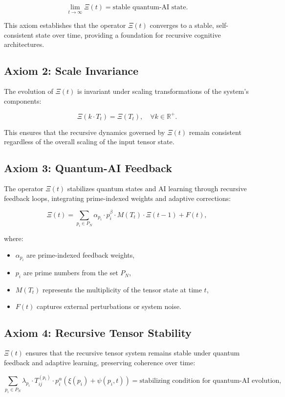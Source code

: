 \documentclass{article}
\theoremstyle{plain}
\begin{document}
\[
\lim_{t \to \infty} \Xi(t) = \text{stable quantum-AI state}.
\]

This axiom establishes that the operator \(\Xi(t)\) converges to a stable, self-consistent state over time, providing a foundation for recursive cognitive architectures.

\subsection{Axiom 2: Scale Invariance}
The evolution of \(\Xi(t)\) is invariant under scaling transformations of the system's components:

\[
\Xi(k \cdot T_t) = \Xi(T_t), \quad \forall k \in \mathbb{R}^+.
\]

This ensures that the recursive dynamics governed by \(\Xi(t)\) remain consistent regardless of the overall scaling of the input tensor state.

\subsection{Axiom 3: Quantum-AI Feedback}
The operator \(\Xi(t)\) stabilizes quantum states and AI learning through recursive feedback loops, integrating prime-indexed weights and adaptive corrections:

\[
\Xi(t) = \sum_{p_i \in P_N} \alpha_{p_i} \cdot p_i^{\beta} \cdot M(T_t) \cdot \Xi(t-1) + F(t),
\]

where:
\begin{itemize}
    \item \(\alpha_{p_i}\) are prime-indexed feedback weights,
    \item \(p_i\) are prime numbers from the set \(P_N\),
    \item \(M(T_t)\) represents the multiplicity of the tensor state at time \(t\),
    \item \(F(t)\) captures external perturbations or system noise.
\end{itemize}

\subsection{Axiom 4: Recursive Tensor Stability}
\(\Xi(t)\) ensures that the recursive tensor system remains stable under quantum feedback and adaptive learning, preserving coherence over time:

\[
\sum_{p_i \in P_N} \lambda_{p_i} \cdot T_{ij}^{(p_i)} \cdot p_i^{\alpha} \left( \xi(p_i) + \psi(p_i, t) \right) = \text{stabilizing condition for quantum-AI evolution},
\]
\end{document}
